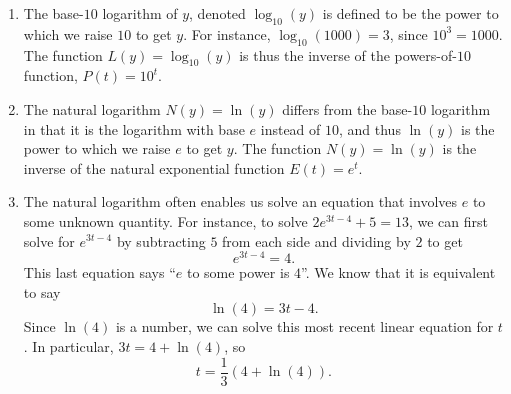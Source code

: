 \documentclass[nooutcomes]{ximera}
\begin{document}
\begin{summary}
\begin{enumerate}
\item
The base-\(10\) logarithm of \(y\), denoted \(\log_{10}(y)\) is defined to be the power to which we raise \(10\)  to get \(y\).  For instance, \(\log_{10}(1000) = 3\), since \(10^3 = 1000\).  The function \(L(y) = \log_{10}(y)\) is thus the inverse of the powers-of-\(10\) function, \(P(t) = 10^t\).%
\item
The natural logarithm \(N(y) = \ln(y)\)  differs from the base-\(10\) logarithm in that it is the logarithm with base \(e\) instead of \(10\), and thus \(\ln(y)\) is the power to which we raise \(e\) to get \(y\).  The function \(N(y) = \ln(y)\) is the inverse of the natural exponential function \(E(t) = e^t\).%
\item
The natural logarithm often enables us solve an equation that involves \(e\) to some unknown quantity.  For instance, to solve \(2e^{3t-4} + 5 = 13\), we can first solve for \(e^{3t-4}\) by subtracting \(5\) from each side and dividing by \(2\) to get%
\begin{equation*}
e^{3t-4} = 4\text{.}
\end{equation*}
This last equation says ``\(e\) to some power is \(4\)''.  We know that it is equivalent to say%
\begin{equation*}
\ln(4) = 3t-4\text{.}
\end{equation*}
Since \(\ln(4)\) is a number, we can solve this most recent linear equation for \(t\).  In particular, \(3t = 4 + \ln(4)\), so%
\begin{equation*}
t = \frac{1}{3}(4 + \ln(4))\text{.}
\end{equation*}
%
\end{enumerate}
\end{summary}
\end{document}
